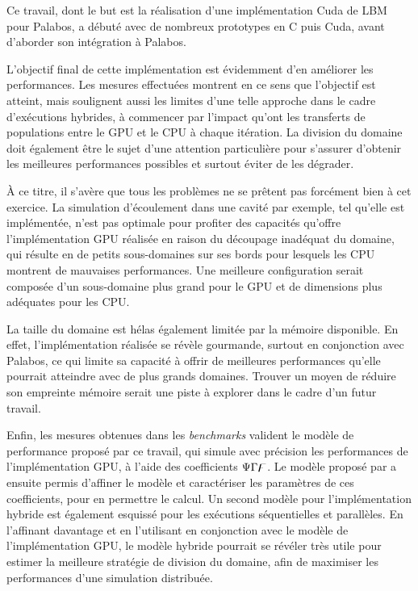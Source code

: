 Ce travail, dont le but est la réalisation d'une implémentation Cuda de \acs{LBM} pour Palabos, a débuté avec de nombreux prototypes en C puis Cuda, avant d'aborder son intégration à Palabos.

L'objectif final de cette implémentation est évidemment d'en améliorer les performances. Les mesures effectuées montrent en ce sens que l'objectif est atteint, mais soulignent aussi les limites d'une telle approche dans le cadre d'exécutions hybrides, à commencer par l'impact qu'ont les transferts de populations entre le \acs{GPU} et le \acs{CPU} à chaque itération. La division du domaine doit également être le sujet d'une attention particulière pour s'assurer d'obtenir les meilleures performances possibles et surtout éviter de les dégrader.

À ce titre, il s'avère que tous les problèmes ne se prêtent pas forcément bien à cet exercice. La simulation d'écoulement dans une cavité par exemple, tel qu'elle est implémentée, n'est pas optimale pour profiter des capacités qu'offre l'implémentation \acs{GPU} réalisée en raison du découpage inadéquat du domaine, qui résulte en de petits sous-domaines sur ses bords pour lesquels les \acs{CPU} montrent de mauvaises performances. Une meilleure configuration serait composée d'un sous-domaine plus grand pour le \acs{GPU} et de dimensions plus adéquates pour les \acs{CPU}.

La taille du domaine est hélas également limitée par la mémoire disponible. En effet, l'implémentation réalisée se révèle gourmande, surtout en conjonction avec Palabos, ce qui limite sa capacité à offrir de meilleures performances qu'elle pourrait atteindre avec de plus grands domaines. Trouver un moyen de réduire son empreinte mémoire serait une piste à explorer dans le cadre d'un futur travail.

Enfin, les mesures obtenues dans les \textit{benchmarks} valident le modèle de performance proposé par ce travail, qui simule avec précision les performances de l'implémentation \acs{GPU}, à l'aide des coefficients $\Psi\Gamma\digamma$. Le modèle proposé par \citet{albuquerque_performance_2012} a ensuite permis d'affiner le modèle et caractériser les paramètres de ces coefficients, pour en permettre le calcul. 
Un second modèle pour l'implémentation hybride est également esquissé pour les exécutions séquentielles et parallèles. En l'affinant davantage et en l'utilisant en conjonction avec le modèle de l'implémentation \acs{GPU}, le modèle hybride pourrait se révéler très utile pour estimer la meilleure stratégie de division du domaine, afin de maximiser les performances d'une simulation distribuée.